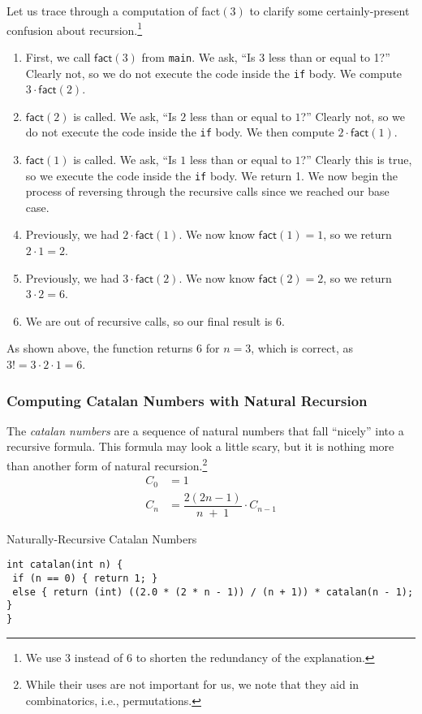 Let us trace through a computation of \textsf{fact}$(3)$ to clarify some certainly-present confusion about recursion.\footnote{We use $3$ instead of $6$ to shorten the redundancy of the explanation.}

\begin{enumerate}[label=(\roman*)]
    \item First, we call $\textsf{fact}(3)$ from \texttt{main}. We ask, ``Is $3$ less than or equal to 1?'' Clearly not, so we do not execute the code inside the \texttt{if} body. We compute $3 \cdot\textsf{fact}(2)$.
    \item $\textsf{fact}(2)$ is called. We ask, ``Is $2$ less than or equal to $1$?'' Clearly not, so we do not execute the code inside the \texttt{if} body. We then compute $2 \cdot \textsf{fact}(1)$.
    \item $\textsf{fact}(1)$ is called. We ask, ``Is $1$ less than or equal to $1$?'' Clearly this is true, so we execute the code inside the \texttt{if} body. We return 1. We now begin the process of reversing through the recursive calls since we reached our base case.
    \item Previously, we had $2 \cdot \textsf{fact}(1)$. We now know $\textsf{fact}(1)=1$, so we return $2\cdot{1}=2$.
    \item Previously, we had $3 \cdot \textsf{fact}(2)$. We now know $\textsf{fact}(2)=2$, so we return $3\cdot{2}=6$.
    \item We are out of recursive calls, so our final result is $6$.
\end{enumerate}

As shown above, the function returns $6$ for $n=3$, which is correct, as $3!=3\cdot{2}\cdot{1}=6$.

\subsubsection*{Computing Catalan Numbers with Natural Recursion}

The \textit{catalan numbers} are a sequence of natural numbers that fall ``nicely'' into a recursive formula. This formula may look a little scary, but it is nothing more than another form of natural recursion.\footnote{While their uses are not important for us, we note that they aid in combinatorics, i.e., permutations.}
\begin{align*}
    C_0 &= 1\\
    C_n &= \dfrac{2(2n-1)}{n\;+\;1}\cdot{C_{n-1}}
\end{align*}
\begin{cl}[main.c]{Naturally-Recursive Catalan Numbers}
\begin{lstlisting}[language=MyC]
int catalan(int n) {
 if (n == 0) { return 1; }
 else { return (int) ((2.0 * (2 * n - 1)) / (n + 1)) * catalan(n - 1); }
}
\end{lstlisting}
\end{cl}

